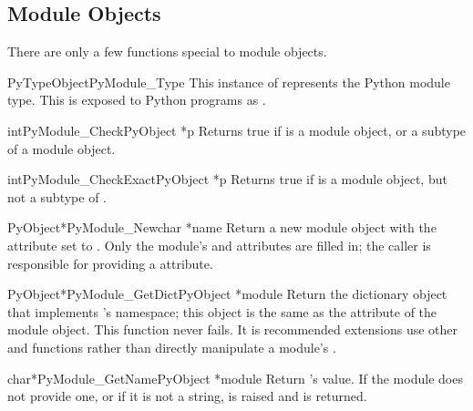 \subsection{Module Objects \label{moduleObjects}}

There are only a few functions special to module objects.

\begin{cvardesc}{PyTypeObject}{PyModule_Type}
  This instance of  represents the Python module
  type.  This is exposed to Python programs as
  .
\end{cvardesc}

\begin{cfuncdesc}{int}{PyModule_Check}{PyObject *p}
  Returns true if  is a module object, or a subtype of a module
  object.
\end{cfuncdesc}

\begin{cfuncdesc}{int}{PyModule_CheckExact}{PyObject *p}
  Returns true if  is a module object, but not a subtype of
  .
\end{cfuncdesc}

\begin{cfuncdesc}{PyObject*}{PyModule_New}{char *name}
  Return a new module object with the  attribute set
  to .  Only the module's  and
   attributes are filled in; the caller is
  responsible for providing a  attribute.
\end{cfuncdesc}

\begin{cfuncdesc}{PyObject*}{PyModule_GetDict}{PyObject *module}
  Return the dictionary object that implements 's
  namespace; this object is the same as the 
  attribute of the module object.  This function never fails.
  It is recommended extensions use other 
  and  functions rather than directly
  manipulate a module's .
\end{cfuncdesc}

\begin{cfuncdesc}{char*}{PyModule_GetName}{PyObject *module}
  Return 's  value.  If the module does
  not provide one, or if it is not a string, 
  is raised and \NULL{} is returned.
\end{cfuncdesc}

